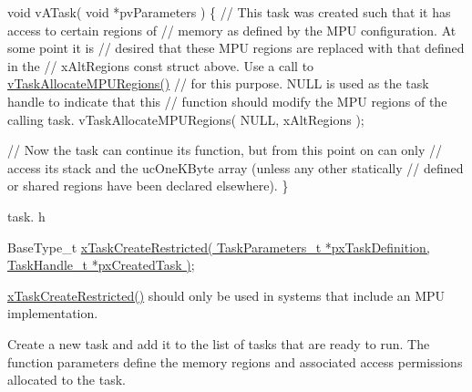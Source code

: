 \begin{DoxyPre}void vATask( void *pvParameters )
\{
 // This task was created such that it has access to certain regions of
 // memory as defined by the MPU configuration.  At some point it is
 // desired that these MPU regions are replaced with that defined in the
 // xAltRegions const struct above.  Use a call to \hyperlink{externals_2freertos_2include_2task_8h_ad889595baff9faf9efe02f3696825409}{vTaskAllocateMPURegions()}
 // for this purpose.  NULL is used as the task handle to indicate that this
 // function should modify the MPU regions of the calling task.
 vTaskAllocateMPURegions( NULL, xAltRegions );\end{DoxyPre}



\begin{DoxyPre} // Now the task can continue its function, but from this point on can only
 // access its stack and the ucOneKByte array (unless any other statically
 // defined or shared regions have been declared elsewhere).
\}
\end{DoxyPre}


task. h 
\begin{DoxyPre}
 BaseType\_t \hyperlink{vendor_2ceedling_2plugins_2freertos_2src_2freertos_2include_2task_8h_a61b00cd623953f4f94fe794057d7f648}{xTaskCreateRestricted( TaskParameters\_t *pxTaskDefinition, TaskHandle\_t *pxCreatedTask )};\end{DoxyPre}


\hyperlink{vendor_2ceedling_2plugins_2freertos_2src_2freertos_2include_2task_8h_a61b00cd623953f4f94fe794057d7f648}{x\+Task\+Create\+Restricted()} should only be used in systems that include an M\+PU implementation.

Create a new task and add it to the list of tasks that are ready to run. The function parameters define the memory regions and associated access permissions allocated to the task.


